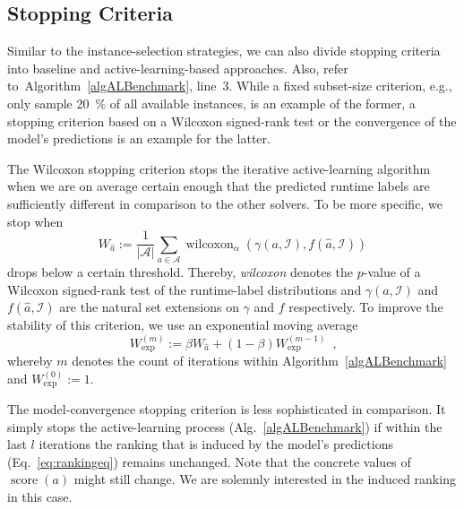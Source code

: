 \documentclass[runningheads]{llncs}
\begin{document}
\subsection{Stopping Criteria}
\label{sec:main3}
Similar to the instance-selection strategies, we can also divide stopping criteria into baseline and active-learning-based approaches.
Also, refer to~Algorithm~\ref{algALBenchmark}, line~3.
While a fixed subset-size criterion, e.g., only sample \SI{20}{\%} of all available instances, is an example of the former, a stopping criterion based on a Wilcoxon signed-rank test or the convergence of the model's predictions is an example for the latter.

The Wilcoxon stopping criterion stops the iterative active-learning algorithm when we are on average certain enough that the predicted runtime labels are sufficiently different in comparison to the other solvers.
To be more specific, we stop when
\begin{equation}
  W_{\hat{a}} := \frac{1}{\left\lvert \mathcal{A} \right\rvert} \sum_{a \in \mathcal{A}} \operatorname{wilcoxon}_{\alpha}\!\left(\gamma\!\left(a, \mathcal{I}\right), f\!\left(\hat{a}, \mathcal{I}\right) \right)
\end{equation}
drops below a certain threshold.
Thereby, \emph{wilcoxon} denotes the $p$-value of a Wilcoxon signed-rank test of the runtime-label distributions and $\gamma\!\left(a, \mathcal{I}\right)$ and $f\!\left(\hat{a}, \mathcal{I}\right)$ are the natural set extensions on $\gamma$ and $f$ respectively.
To improve the stability of this criterion, we use an exponential moving average
\begin{equation}
  W_{\exp}^{\left(m\right)} := \beta W_{\hat{a}} + \left(1 - \beta\right) W_{\exp}^{\left(m - 1\right)} \enspace \textrm{,}
\end{equation}
whereby $m$ denotes the count of iterations within Algorithm~\ref{algALBenchmark} and $W_{\exp}^{\left(0\right)} := 1$.

The model-convergence stopping criterion is less sophisticated in comparison.
It simply stops the active-learning process (Alg.~\ref{algALBenchmark}) if within the last $l$ iterations the ranking that is induced by the model's predictions (Eq.~\ref{eq:rankingeq}) remains unchanged.
Note that the concrete values of $\operatorname{score}\!\left(a\right)$ might still change.
We are solemnly interested in the induced ranking in this case.
\end{document}

